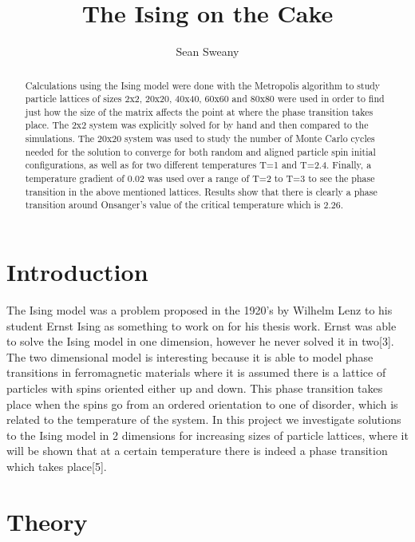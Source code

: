 \documentclass[12pt,righttag]{article}
\begin{document}
	\title{The Ising on the Cake}
	\author{Sean Sweany}
	\renewcommand{\today}{April 27, 2016}
	\maketitle
	
	\begin{abstract}
Calculations using the Ising model were done with the Metropolis algorithm to study particle lattices of sizes 2x2, 20x20, 40x40, 60x60 and 80x80 were used in order to find just how the size of the matrix affects the point at where the phase transition takes place. The 2x2 system was explicitly solved for by hand and then compared to the simulations. The 20x20 system was used to study the number of Monte Carlo cycles needed for the solution to converge for both random and aligned particle spin initial configurations, as well as for two different temperatures T=1 and T=2.4. Finally, a temperature gradient of 0.02 was used over a range of T=2 to T=3 to see the phase transition in the above mentioned lattices. Results show that there is clearly a phase transition around Onsanger's value of the critical temperature which is 2.26.
	\end{abstract}

	
	\section{Introduction}
   The Ising model was a problem proposed in the 1920's by Wilhelm Lenz to his student Ernst Ising as something to work on for his thesis work. Ernst was able to solve the Ising model in one dimension, however he never solved it in two[3]. The two dimensional model is interesting because it is able to model phase transitions in ferromagnetic materials where it is assumed there is a lattice of particles with spins oriented either up and down. This phase transition takes place when the spins go from an ordered orientation to one of disorder, which is related to the temperature of the system. In this project we investigate solutions to the Ising model in 2 dimensions for increasing sizes of particle lattices, where it will be shown that at a certain temperature there is indeed a phase transition which takes place[5].


\section{Theory}
\end{document}

